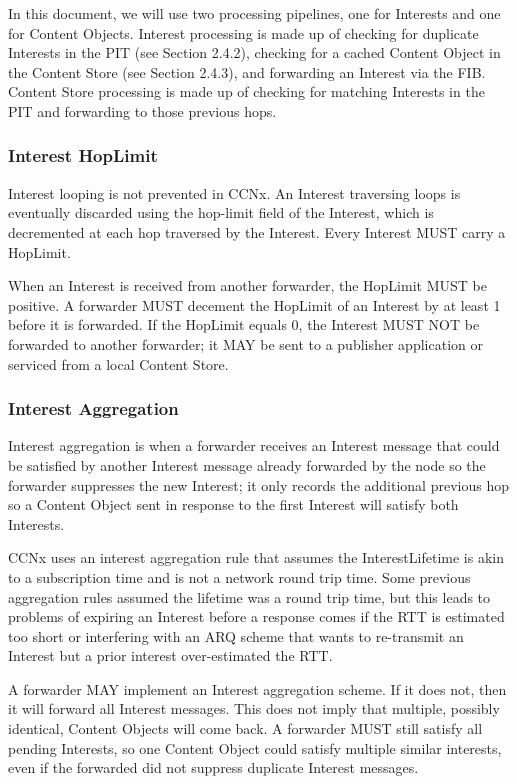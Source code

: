 \documentclass[12pt]{article}
\begin{document}
In this document, we will use two processing pipelines, one for
Interests and one for Content Objects.  Interest processing is made
up of checking for duplicate Interests in the PIT (see
Section 2.4.2), checking for a cached Content Object in the Content
Store (see Section 2.4.3), and forwarding an Interest via the FIB.
Content Store processing is made up of checking for matching
Interests in the PIT and forwarding to those previous hops.

\subsubsection{Interest HopLimit}
Interest looping is not prevented in CCNx.  An Interest traversing
loops is eventually discarded using the hop-limit field of the
Interest, which is decremented at each hop traversed by the Interest.
Every Interest MUST carry a HopLimit.

When an Interest is received from another forwarder, the HopLimit
MUST be positive.  A forwarder MUST decement the HopLimit of an
Interest by at least 1 before it is forwarded.
If the HopLimit equals 0, the Interest MUST NOT be forwarded to
another forwarder; it MAY be sent to a publisher application or
serviced from a local Content Store.

\subsubsection{Interest Aggregation}
Interest aggregation is when a forwarder receives an Interest message
that could be satisfied by another Interest message already forwarded
by the node so the forwarder suppresses the new Interest; it only
records the additional previous hop so a Content Object sent in
response to the first Interest will satisfy both Interests.

CCNx uses an interest aggregation rule that assumes the
InterestLifetime is akin to a subscription time and is not a network
round trip time.  Some previous aggregation rules assumed the
lifetime was a round trip time, but this leads to problems of
expiring an Interest before a response comes if the RTT is estimated
too short or interfering with an ARQ scheme that wants to re-transmit
an Interest but a prior interest over-estimated the RTT.

A forwarder MAY implement an Interest aggregation scheme.  If it does
not, then it will forward all Interest messages.  This does not imply
that multiple, possibly identical, Content Objects will come back.  A
forwarder MUST still satisfy all pending Interests, so one Content
Object could satisfy multiple similar interests, even if the
forwarded did not suppress duplicate Interest messages.
\end{document}
